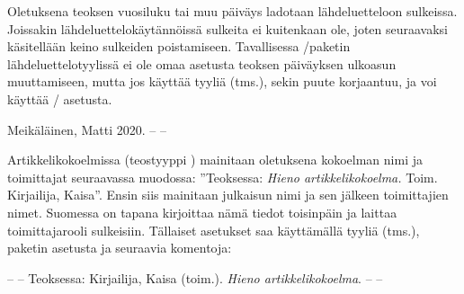 \begin{koodilohkosis}
\end{koodilohkosis}

Oletuksena teoksen vuosiluku tai muu päiväys ladotaan lähdeluetteloon
sulkeissa. Joissakin lähdeluettelokäytännöissä sulkeita ei kuitenkaan
ole, joten seuraavaksi käsitellään keino sulkeiden poistamiseen.
Tavallisessa \-/paketin lähdeluettelotyylissä
 ei ole omaa asetusta teoksen päiväyksen ulkoasun
muuttamiseen, mutta jos käyttää tyyliä  (tms.),
sekin puute korjaantuu, ja voi käyttää \-/
asetusta.

\begin{koodilohkosis}
\usepackage[style=ext-authoryear]{biblatex}

\end{koodilohkosis}

\begin{tulossis}
  Meikäläinen, Matti 2020. -- --
\end{tulossis}

Artikkelikokoelmissa (teostyyppi ) mainitaan
oletuksena kokoelman nimi ja toimittajat seuraavassa muodossa:
''Teoksessa: \textit{Hieno artikkelikokoelma.} Toim. Kirjailija,
Kaisa''. Ensin siis mainitaan julkaisun nimi ja sen jälkeen toimittajien
nimet. Suomessa on tapana kirjoittaa nämä tiedot toisinpäin ja laittaa
toimittajarooli sulkeisiin. Tällaiset asetukset saa käyttämällä tyyliä
 (tms.), paketin asetusta
 ja seuraavia komentoja:

\begin{koodilohkosis}
\usepackage[style=ext-authoryear, innamebeforetitle=true]{biblatex}

\end{koodilohkosis}

\begin{tulossis}
  -- -- Teoksessa: Kirjailija, Kaisa (toim.). \textit{Hieno
    artikkelikokoelma}. -- --
\end{tulossis}

